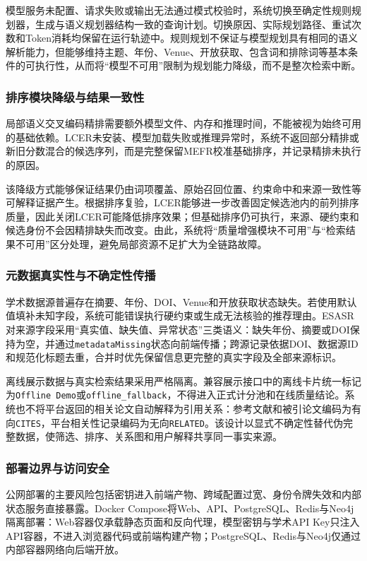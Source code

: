 \documentclass[a4paper,12pt,fontset=none]{ctexart}
\begin{document}
模型服务未配置、请求失败或输出无法通过模式校验时，系统切换至确定性规则规划器，生成与语义规划器结构一致的查询计划。切换原因、实际规划路径、重试次数和Token消耗均保留在运行轨迹中。规则规划不保证与模型规划具有相同的语义解析能力，但能够维持主题、年份、Venue、开放获取、包含词和排除词等基本条件的可执行性，从而将“模型不可用”限制为规划能力降级，而不是整次检索中断。

\subsubsection{排序模块降级与结果一致性}

局部语义交叉编码精排需要额外模型文件、内存和推理时间，不能被视为始终可用的基础依赖。LCER未安装、模型加载失败或推理异常时，系统不返回部分精排或新旧分数混合的候选序列，而是完整保留MEFR校准基础排序，并记录精排未执行的原因。

该降级方式能够保证结果仍由词项覆盖、原始召回位置、约束命中和来源一致性等可解释证据产生。根据排序复验，LCER能够进一步改善固定候选池内的前列排序质量，因此关闭LCER可能降低排序效果；但基础排序仍可执行，来源、硬约束和候选身份不会因精排缺失而改变。由此，系统将“质量增强模块不可用”与“检索结果不可用”区分处理，避免局部资源不足扩大为全链路故障。

\subsubsection{元数据真实性与不确定性传播}

学术数据源普遍存在摘要、年份、DOI、Venue和开放获取状态缺失。若使用默认值填补未知字段，系统可能错误执行硬约束或生成无法核验的推荐理由。ESASR对来源字段采用“真实值、缺失值、异常状态”三类语义：缺失年份、摘要或DOI保持为空，并通过\texttt{metadataMissing}状态向前端传播；跨源记录依据DOI、数据源ID和规范化标题去重，合并时优先保留信息更完整的真实字段及全部来源标识。

离线展示数据与真实检索结果采用严格隔离。兼容展示接口中的离线卡片统一标记为\texttt{Offline Demo}或\texttt{offline\_fallback}，不得进入正式计分池和在线质量结论。系统也不将平台返回的相关论文自动解释为引用关系：参考文献和被引论文编码为有向\texttt{CITES}，平台相关性记录编码为无向\texttt{RELATED}。该设计以显式不确定性替代伪完整数据，使筛选、排序、关系图和用户解释共享同一事实来源。

\subsubsection{部署边界与访问安全}

公网部署的主要风险包括密钥进入前端产物、跨域配置过宽、身份令牌失效和内部状态服务直接暴露。Docker Compose将Web、API、PostgreSQL、Redis与Neo4j隔离部署：Web容器仅承载静态页面和反向代理，模型密钥与学术API Key只注入API容器，不进入浏览器代码或前端构建产物；PostgreSQL、Redis与Neo4j仅通过内部容器网络向后端开放。
\end{document}
